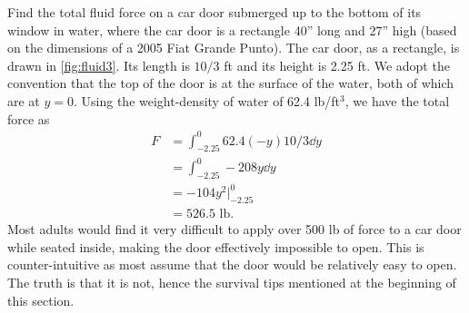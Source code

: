\begin{example}\label{ex_fluid3}%
Find the total fluid force on a car door submerged up to the bottom of its window in water, where the car door is a rectangle 40'' long and 27'' high (based on the dimensions of a 2005 Fiat Grande Punto).
\solution
The car door, as a rectangle, is drawn in \autoref{fig:fluid3}. Its length is $10/3$ ft and its height is 2.25 ft. We adopt the convention that the top of the door is at the surface of the water, both of which are at $y=0$. Using the weight-density of water of 62.4 lb/ft$^3$, we have the total force as
%
%
\begin{align*}
	F &=	\int_{-2.25}^0 62.4(-y)10/3\dd y \\
	&= 	\int_{-2.25}^0 -208y\dd y\\
	&= -104y^2\Big|_{-2.25}^0 \\
	&=	526.5 \text{ lb.}
\end{align*}
Most adults would find it very difficult to apply over 500 lb of force to a car door while seated inside, making the door effectively impossible to open. This  is  counter-intuitive as most assume that the door would be relatively easy to open. The truth is that it is not, hence the survival tips mentioned at the beginning of this section.
\end{example}

